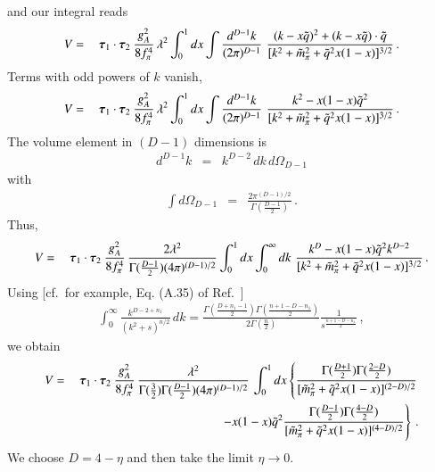 \documentclass[sort&compress,preprint,3p]{elsarticle}
\newcommand{\bbox}[1]{\mbox{\boldmath $#1$}}
\begin{document}
%
and our integral reads
%
\begin{eqnarray}
V &=&
\: \bbox{\tau}_1 \cdot \bbox{\tau}_2 \:
\frac{g_A^2}{8 f_\pi^4} \,
\lambda^{2}
\int_0^1 dx \int \frac{d^{D-1}k}{(2 \pi)^{D-1}} \,\,
\frac{(k-x\tilde{q})^2 + (k-x\tilde{q})\cdot \tilde q}
{[k^2 + \tilde{m}_\pi^2 + \tilde{q}^2 x (1-x)]^{3/2}}
\,.
\end{eqnarray}
%
Terms with odd powers of $k$ vanish,
%
\begin{eqnarray}
V &=&
\: \bbox{\tau}_1 \cdot \bbox{\tau}_2 \:
\frac{g_A^2}{8 f_\pi^4} \,
\lambda^{2}
\int_0^1 dx \int \frac{d^{D-1}k}{(2 \pi)^{D-1}} \,\,
\frac{k^2-x(1-x)\tilde{q}^2}
{[k^2 + \tilde{m}_\pi^2 + \tilde{q}^2 x (1-x)]^{3/2}}
\,.
\end{eqnarray}
%
The volume element in $(D-1)$ dimensions is
%
\begin{eqnarray}
d^{D-1}k &=& k^{D-2}\,dk\,d\Omega_{D-1}
\label{eq_vol1}
\end{eqnarray}
with
\begin{eqnarray}
\int d\Omega_{D-1} &=& \frac{2 \pi^{(D-1)/2}}{\Gamma(\frac{D-1}{2})}
\,.
\label{eq_vol2}
\end{eqnarray}
%
Thus,
%
\begin{eqnarray}
V &=&
\: \bbox{\tau}_1 \cdot \bbox{\tau}_2 \:
\frac{g_A^2}{8 f_\pi^4} \,
\frac{2\lambda^{2}}{\Gamma(\frac{D-1}{2}) (4 \pi)^{(D-1)/2}} 
\int_0^1 dx 
\int_0^\infty dk \,\,
\frac{k^D-x(1-x)\tilde{q}^2k^{D-2}}
{[k^2 + \tilde{m}_\pi^2 + \tilde{q}^2 x (1-x)]^{3/2}}
\,.
\end{eqnarray}
%
Using [cf.\ for example, Eq. (A.35) of Ref.~\cite{Sch03}]
%
\begin{eqnarray}
\int_0^\infty \frac{k^{D-2+n_1}}{(k^2+s)^{n/2}} \,dk =
\frac{\Gamma(\frac{D+n_1-1}{2})\Gamma(\frac{n+1-D-n_1}{2})}{2\Gamma(\frac{n}{2})}
\frac{1}{s^{\frac{n+1-D-n_1}{2}}}
\,,
\label{eq_SchA35}
\end{eqnarray}
%
we obtain
%
\begin{eqnarray}
V &=&
\: \bbox{\tau}_1 \cdot \bbox{\tau}_2 \:
\frac{g_A^2}{8 f_\pi^4} \,
\frac{\lambda^{2}}{\Gamma(\frac 3 2)\Gamma(\frac{D-1}{2}) (4 \pi)^{(D-1)/2}} \,
\int_0^1 dx 
\left\{
\frac{\Gamma(\frac{D+1}{2})\Gamma(\frac{2-D}{2})}
{[\tilde{m}_\pi^2 + \tilde{q}^2 x (1-x)]^{(2-D)/2}}
\right. \nonumber \\ && \left.
-x(1-x)\tilde{q}^2
\frac{\Gamma(\frac{D-1}{2})\Gamma(\frac{4-D}{2})}
{[\tilde{m}_\pi^2 + \tilde{q}^2 x (1-x)]^{(4-D)/2}}
\right\}
\,.
\end{eqnarray}
%
We choose $D=4-\eta$ and then take the limit $\eta \to 0$. 
\end{document}
